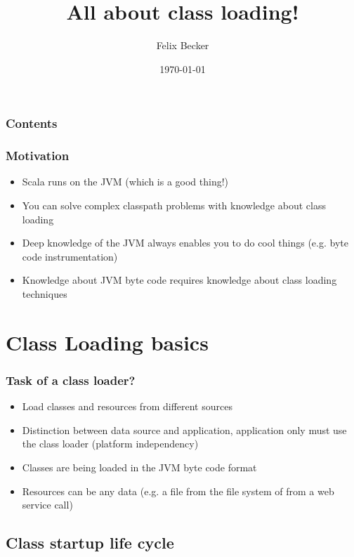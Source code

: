 \documentclass[aspectratio=169]{beamer}
\title{All about class loading!}
\author{Felix Becker}
\date{\today}
\institute{Amsterdam.scala}
\begin{document}
\maketitle


\begin{frame}
	\frametitle{Contents}
	\tableofcontents
\end{frame}


\begin{frame}
	\frametitle{Motivation}
	\begin{itemize}
		\item{Scala runs on the JVM (which is a good thing!)}
		\item{You can solve complex classpath problems with knowledge about class loading}
		\item{Deep knowledge of the JVM always enables you to do cool things (e.g. byte code instrumentation)}
		\item{Knowledge about JVM byte code requires knowledge about class loading techniques}
	\end{itemize}
\end{frame}

\section{Class Loading basics}

\begin{frame}
	\frametitle{Task of a class loader?}
	\begin{itemize}
		\item{Load classes and resources from different sources}
		\item{Distinction between data source and application, application only must use the class loader (platform independency)}
		\item{Classes are being loaded in the JVM byte code format}
		\item{Resources can be any data (e.g. a file from the file system of from a web service call)}
	\end{itemize}
\end{frame}

\subsection{Class startup life cycle}
\end{document}
